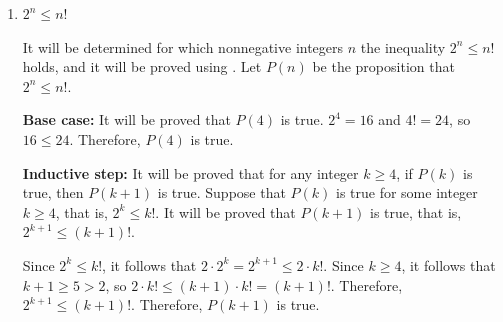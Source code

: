 \begin{enumerate}
\begin{enumerate}
\begin{subprove}
      \textbf{Base case:} It will be proved that \(P(5)\) is true.
      \(5^{2} = 25\) and \(2^{5} = 32\), so \(25 < 32\).
      Therefore, \(P(5)\) is true.
      
      \textbf{Inductive step:} It will be proved that for any integer \(k \geq 5\), if \(P(k)\) is true, then \(P(k+1)\) is true.
      Suppose that \(P(k)\) is true for some integer \(k \geq 5\), that is, \(k^{2} < 2^{k}\).
      It will be proved that \(P(k+1)\) is true, that is, \((k+1)^{2} < 2^{k+1}\).
      
      Since \(k^{2} < 2^{k}\), it follows that \(2 k^{2} < 2^{k+1}\).
      It will be proved that \((k+1)^{2} < 2 k^{2}\).
      Since \((k+1)^{2} = k^{2} + 2k + 1\), it suffices to show that \(k^{2} + 2k + 1 < 2 k^{2}\), that is, \(2k + 1 < k^{2}\), that is, \(k^{2} - 2k - 1 > 0\).
      Since \(k \geq 5\), it follows that \(k^{2} - 2k - 1 = k(k-2) - 1 \geq 5(5-2) - 1 = 15 - 1 = 14 > 0\).
      Therefore, \((k+1)^{2} < 2 k^{2} < 2^{k+1}\).
      Therefore, \(P(k+1)\) is true.
      
      By , it follows that \(P(n)\) is true for all integers \(n \geq 5\).
      
      Therefore, the inequality \(n^{2} < 2^{n}\) holds for all nonnegative integers \(n\) with \(n = 0, 1\), or \(n \geq 5\).
    \end{subprove}
    \item \(2^{n} \leq n!\)
    \begin{subprove}
      It will be determined for which nonnegative integers \(n\) the inequality \(2^{n} \leq n!\) holds, and it will be proved using .
      Let \(P(n)\) be the proposition that \(2^{n} \leq n!\).
      
      \textbf{Base case:} It will be proved that \(P(4)\) is true.
      \(2^{4} = 16\) and \(4! = 24\), so \(16 \leq 24\).
      Therefore, \(P(4)\) is true.
      
      \textbf{Inductive step:} It will be proved that for any integer \(k \geq 4\), if \(P(k)\) is true, then \(P(k+1)\) is true.
      Suppose that \(P(k)\) is true for some integer \(k \geq 4\), that is, \(2^{k} \leq k!\).
      It will be proved that \(P(k+1)\) is true, that is, \(2^{k+1} \leq (k+1)!\).
      
      Since \(2^{k} \leq k!\), it follows that \(2 \cdot 2^{k} = 2^{k+1} \leq 2 \cdot k!\).
      Since \(k \geq 4\), it follows that \(k + 1 \geq 5 > 2\), so \(2 \cdot k! \leq (k+1) \cdot k! = (k+1)!\).
      Therefore, \(2^{k+1} \leq (k+1)!\).
      Therefore, \(P(k+1)\) is true.
      

\end{subprove}
\end{enumerate}
\end{enumerate}
